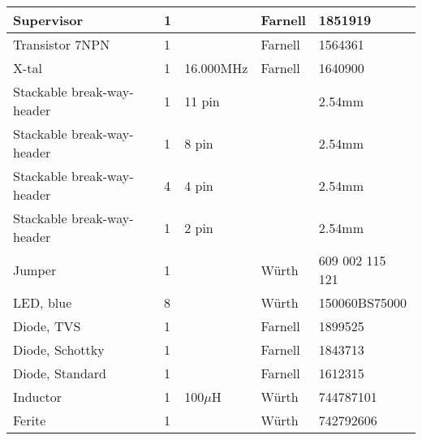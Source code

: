 \begin{center}
\begin{tabularx}{\textwidth}{|X|l|l|l|l|}
Supervisor & 1 & & Farnell & 1851919 \\ \hline
Transistor 7NPN	& 1 & &	Farnell	& 1564361 \\ \hline
X-tal & 1 & 16.000MHz & Farnell & 1640900 \\ \hline
Stackable break-way-header & 1 & 11 pin & & 2.54mm  \\ \hline
Stackable break-way-header & 1 & 8 pin & & 2.54mm \\ \hline
Stackable break-way-header & 4 & 4 pin & & 2.54mm \\ \hline
Stackable break-way-header & 1 & 2 pin & & 2.54mm \\ \hline
Jumper & 1 & & Würth & 609 002 115 121 \\ \hline
LED, blue & 8 & & Würth & 150060BS75000 \\ \hline
Diode, TVS & 1 & & Farnell & 1899525 \\ \hline
Diode, Schottky & 1 & & Farnell & 1843713 \\ \hline
Diode, Standard & 1 & & Farnell & 1612315 \\ \hline
Inductor & 1 & 100$\mu$H & Würth & 744787101 \\ \hline
Ferite & 1 & & Würth & 742792606 \\ \hline

\end{tabularx}
\end{center}

\newpage

